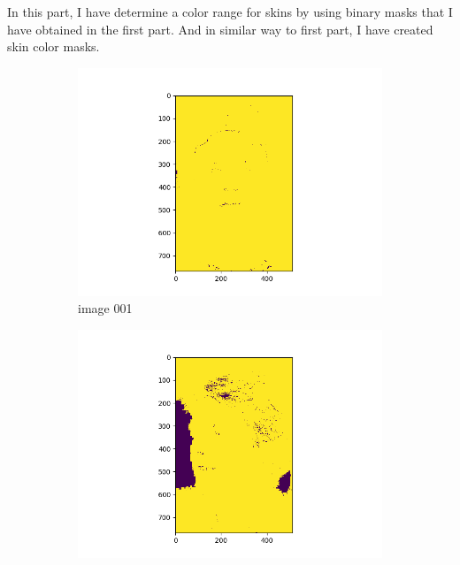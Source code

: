 \documentclass[11pt]{report}
\begin{document}
In this part, I have determine a color range for skins by using binary masks that I have obtained in the first part. And in similar way to first part, I have created skin color masks.

\begin{figure}[H]
    \centering
    \begin{subfigure}{0.3\textwidth}
        \centering
        \includegraphics[width=\textwidth]{Task 2 Plots/skin_color_mask_001.png}
        \caption{image 001}
        \label{fig:skin_colormask1}
    \end{subfigure}
    \begin{subfigure}{0.3\textwidth}
        \centering
        \includegraphics[width=\textwidth]{Task 2 Plots/skin_color_mask_002.png}

\end{subfigure}
\end{figure}
\end{document}
